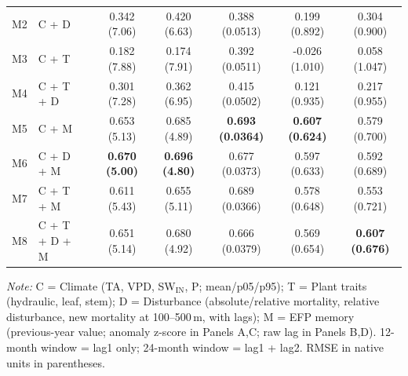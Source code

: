 \begin{table}[htbp]
\begin{tabular}{llcccccc}
M2 & C + D &  & 0.342 (7.06) & 0.420 (6.63) & 0.388 (0.0513) & 0.199 (0.892) & 0.304 (0.900) \\
M3 & C + T &  & 0.182 (7.88) & 0.174 (7.91) & 0.392 (0.0511) & -0.026 (1.010) & 0.058 (1.047) \\
M4 & C + T + D &  & 0.301 (7.28) & 0.362 (6.95) & 0.415 (0.0502) & 0.121 (0.935) & 0.217 (0.955) \\
M5 & C + M &  & 0.653 (5.13) & 0.685 (4.89) & \textbf{0.693 (0.0364)} & \textbf{0.607 (0.624)} & 0.579 (0.700) \\
M6 & C + D + M &  & \textbf{0.670 (5.00)} & \textbf{0.696 (4.80)} & 0.677 (0.0373) & 0.597 (0.633) & 0.592 (0.689) \\
M7 & C + T + M &  & 0.611 (5.43) & 0.655 (5.11) & 0.689 (0.0366) & 0.578 (0.648) & 0.553 (0.721) \\
M8 & C + T + D + M &  & 0.651 (5.14) & 0.680 (4.92) & 0.666 (0.0379) & 0.569 (0.654) & \textbf{0.607 (0.676)} \\
\midrule
\bottomrule
\end{tabular}
\vspace{2pt}
\begin{minipage}{\linewidth}
\footnotesize
\textit{Note:} C = Climate (TA, VPD, SW$_\mathrm{IN}$, P; mean/p05/p95); T = Plant traits (hydraulic, leaf, stem); D = Disturbance (absolute/relative mortality, relative disturbance, new mortality at 100--500\,m, with lags); M = EFP memory (previous-year value; anomaly z-score in Panels A,C; raw lag in Panels B,D). 12-month window = lag1 only; 24-month window = lag1 + lag2. RMSE in native units in parentheses.
\end{minipage}
\end{table}

